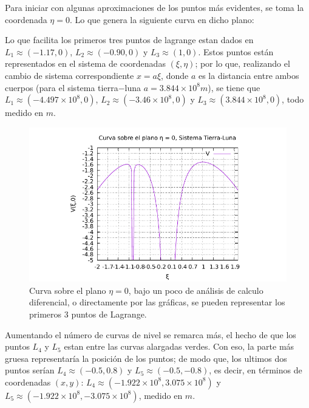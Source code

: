 \begin{multicols}{2}
Para iniciar con algunas aproximaciones de los puntos más evidentes, se toma la coordenada $\eta = 0$. Lo que genera la siguiente curva en dicho plano: 

Lo que facilita los primeros tres puntos de lagrange estan dados en $L_1 \approx (-1.17,0)$, $L_2 \approx (-0.90,0)$ y $L_3 \approx (1,0)$. Estos puntos están representados en el sistema de coordenadas $(\xi ,\eta)$; por lo que, realizando el cambio de sistema correspondiente $x = a\xi$, donde $a$ es la distancia entre ambos cuerpos (para el sistema tierra$-$luna $a = 3.844\times 10^{8} m$), se tiene que $L_1 \approx (-4.497\times 10^{8},0)$, $L_2 \approx (-3.46\times 10^{8},0)$ y $L_3 \approx (3.844\times 10^{8},0)$, todo medido en $m$.
\columnbreak
\begin{figure}[H]
	\centering
	\includegraphics[scale=0.7]{Codigos/planePlotTierraLuna.pdf}
	\caption{Curva sobre el plano $\eta = 0$, bajo un poco de análisis de calculo diferencial, o directamente por las gráficas, se pueden representar los primeros $3$ puntos de Lagrange.}
	\label{fig:planeplot t-l}
\end{figure}
\end{multicols}

Aumentando el número de curvas de nivel se remarca más, el hecho de que los puntos $L_4$ y $L_5$ estan entre las curvas alargadas verdes. Con eso, la parte más gruesa representaría la posición de los puntos; de modo que, los ultimos dos puntos serían $L_4 \approx (-0.5,0.8)$ y $L_5 \approx (-0.5,-0.8)$, es decir, en términos de coordenadas $(x,y)$: $L_4 \approx (-1.922\times 10^{8},3.075 \times 10^{8})$ y $L_5 \approx (-1.922 \times 10^{8},-3.075 \times 10^{8})$, medido en $m$.





